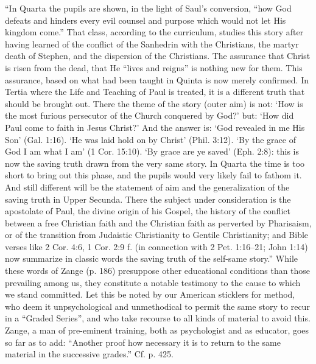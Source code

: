 “In Quarta the pupils are shown, in the light of Saul's conversion, “how God defeats and hinders every evil counsel and purpose which would not let His kingdom come.” That class, according to the curriculum, studies this story after having learned of the conflict of the Sanhedrin with the Christians, the martyr death of
Stephen, and the dispersion of the Christians. The assurance that Christ is risen from the dead, that He “lives and reigns” is nothing new for them. This assurance, based on what had been taught in Quinta is now merely confirmed. In Tertia where the Life and Teaching of Paul is treated, it is a different truth that should be brought out. There the theme of the story (outer aim) is not: ‘How is the most furious persecutor of the Church conquered by God?’ but: ‘How did Paul come to faith in Jesus Christ?’ And the answer is: ‘God revealed in me His Son’ (Gal. 1:16). ‘He was laid hold on by Christ’ (Phil. 3:12). ‘By the grace of God I am what I am’ (1 Cor. 15:10). ‘By grace are ye saved’ (Eph. 2:8): this is now the saving truth drawn from the very same story. In Quarta the time is too short to bring out this phase, and the pupils would very likely fail to fathom it. And still different will be the statement of aim and the generalization of the saving truth in Upper Secunda. There the subject under consideration is the apostolate of Paul, the divine origin of his Gospel, the history of the conflict between a free Christian faith and the Christian faith as perverted by Pharisaism, or of the transition from Judaistic Christianity to Gentile Christianity; and Bible verses like 2 Cor. 4:6, 1 Cor. 2:9 f. (in connection with 2 Pet. 1:16–21; John 1:14) now summarize in classic words the saving truth of the self-same story.” While these words of Zange (p. 186) presuppose other educational conditions than those prevailing among us, they constitute a notable testimony to the cause to which we stand committed. Let this be noted by our American sticklers for method, who deem it unpsychological and unmethodical to permit the same story to recur in a “Graded Series”, and who take recourse to all kinds of material to avoid this. Zange, a man of pre-eminent training, both as psychologist and as educator, goes so far as to add: “Another proof how necessary it is to return to the same material in the successive grades.” Cf. p. 425.

